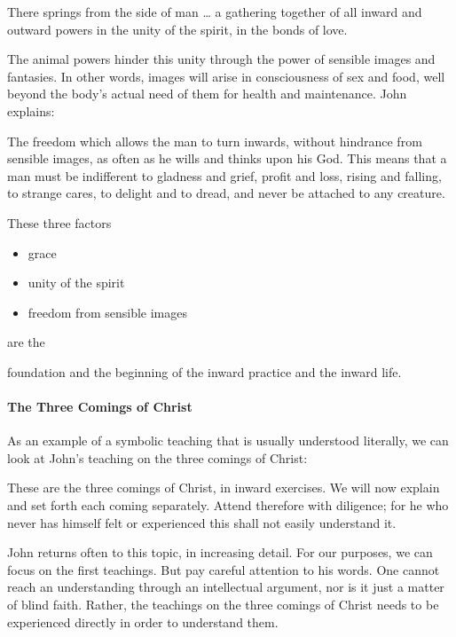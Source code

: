\begin{quotex}
There springs from the side of man … a gathering together of all inward and outward powers in the unity of the spirit, in the bonds of love. 

\end{quotex}
The animal powers hinder this unity through the power of sensible images and fantasies. In other words, images will arise in consciousness of sex and food, well beyond the body's actual need of them for health and maintenance. John explains:

\begin{quotex}
The freedom which allows the man to turn inwards, without hindrance from sensible images, as often as he wills and thinks upon his God. This means that a man must be indifferent to gladness and grief, profit and loss, rising and falling, to strange cares, to delight and to dread, and never be attached to any creature. 

\end{quotex}
These three factors

\begin{itemize}
\item grace 
\item unity of the spirit 
\item freedom from sensible images 
\end{itemize}
are the 

\begin{quotex}
foundation and the beginning of the inward practice and the inward life. 

\end{quotex}
\paragraph{The Three Comings of Christ}
As an example of a symbolic teaching that is usually understood literally, we can look at John's teaching on the three comings of Christ:

\begin{quotex}
These are the three comings of Christ, in inward exercises. We will now explain and set forth each coming separately. Attend therefore with diligence; for he who never has himself felt or experienced this shall not easily understand it. 

\end{quotex}
John returns often to this topic, in increasing detail. For our purposes, we can focus on the first teachings. But pay careful attention to his words. One cannot reach an understanding through an intellectual argument, nor is it just a matter of blind faith. Rather, the teachings on the three comings of Christ needs to be experienced directly in order to understand them.

